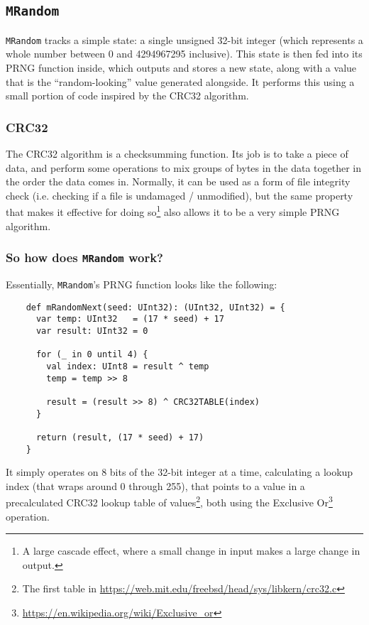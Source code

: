 \documentclass[12pt,a4paper,notitlepage]{extarticle}
\begin{document}
        \subsection*{\texttt{MRandom}}
            \texttt{MRandom} tracks a simple state: a single unsigned 32-bit integer (which
            represents a whole number between 0 and 4294967295 inclusive). This state is then
            fed into its PRNG function inside, which outputs and stores a new state, along
            with a value that is the ``random-looking'' value generated alongside. It performs
            this using a small portion of code inspired by the CRC32 algorithm.

            \subsubsection*{CRC32}
                The CRC32 algorithm is a checksumming function. Its job is to take a piece of
                data, and perform some operations to mix groups of bytes in the data together
                in the order the data comes in. Normally, it can be used as a form of file
                integrity check (i.e. checking if a file is undamaged / unmodified), but the
                same property that makes it effective for doing so\footnote{A large cascade
                effect, where a small change in input makes a large change in output.} also
                allows it to be a very simple PRNG algorithm.

            \subsubsection*{So how does \texttt{MRandom} work?}
                Essentially, \texttt{MRandom}'s PRNG function looks like the following:

                \begin{lstlisting}
    def mRandomNext(seed: UInt32): (UInt32, UInt32) = {
      var temp: UInt32   = (17 * seed) + 17
      var result: UInt32 = 0

      for (_ in 0 until 4) {
        val index: UInt8 = result ^ temp
        temp = temp >> 8

        result = (result >> 8) ^ CRC32TABLE(index)
      }

      return (result, (17 * seed) + 17)
    }
                \end{lstlisting}

                It simply operates on 8 bits of the 32-bit integer at a time, calculating a
                lookup index (that wraps around 0 through 255), that points to a value in
                a precalculated CRC32 lookup table of values\footnote{The first table in
                \url{https://web.mit.edu/freebsd/head/sys/libkern/crc32.c}}, both using the
                Exclusive Or\footnote{\url{https://en.wikipedia.org/wiki/Exclusive_or}}
                operation.
\end{document}
